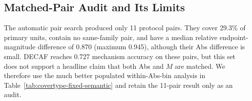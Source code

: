 \subsection{Matched-Pair Audit and Its Limits}
\label{app:covertype-matched-limit}

The automatic pair search produced only 11 protocol pairs. They cover 29.3\% of primary units, contain no same-family pair, and have a median relative endpoint-magnitude difference of 0.870 (maximum 0.945), although their Abs difference is small. DECAF reaches 0.727 mechanism accuracy on these pairs, but this set does not support a headline claim that both Abs and $M$ are matched. We therefore use the much better populated within-Abs-bin analysis in Table~\ref{tab:covertype-fixed-semantic} and retain the 11-pair result only as an audit.
